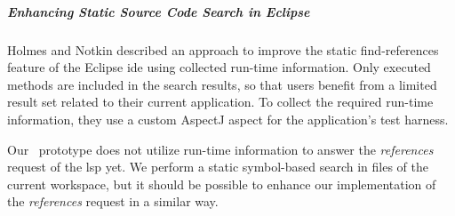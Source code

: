 
    \subparagraph{Enhancing Static Source Code Search in Eclipse}
    Holmes and Notkin \cite{holmes2010enhancing} described an approach to improve the static find-references feature of the Eclipse \ac{ide} using collected run-time information. Only executed methods are included in the search results, so that users benefit from a limited result set related to their current application. To collect the required run-time information, they use a custom AspectJ \cite{kiczales2001overview} aspect for the application's test harness. %

    Our \graallsp~prototype does not utilize run-time information to answer the \emph{references} request of the \ac{lsp} yet. We perform a static symbol-based search in files of the current workspace, but it should be possible to enhance our implementation of the \emph{references} request in a similar way.

